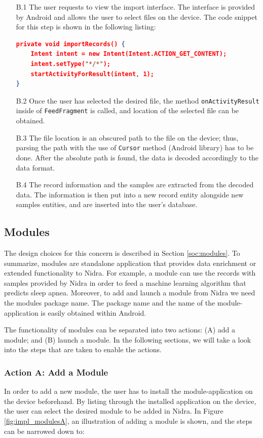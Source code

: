 \begin{itemize}
    \item[B.1] The user requests to view the import interface. The interface is provided by Android and allows the user to select files on the device. The code snippet for this step is shown in the following listing:
\begin{lstlisting}[language=json, caption={}, captionpos=b]
private void importRecords() {
    Intent intent = new Intent(Intent.ACTION_GET_CONTENT);
    intent.setType("*/*");
    startActivityForResult(intent, 1);
}

\end{lstlisting}
    \item[B.2] Once the user has selected the desired file, the method \verb|onActivityResult| inside of \verb|FeedFragment| is called, and location of the selected file can be obtained. 
    \item[B.3] The file location is an obscured path to the file on the device; thus, parsing the path with the use of \verb|Cursor| method (Android library) has to be done. After the absolute path is found, the data is decoded accordingly to the data format.
    \item[B.4] The record information and the samples are extracted from the decoded data. The information is then put into a new record entity alongside new samples entities, and are inserted into the user's database. 
\end{itemize}

\subsection{Modules}
The design choices for this concern is described in Section \ref{soc:modules}. To summarize, modules are standalone application that provides data enrichment or extended functionality to Nidra. For example, a module can use the records with samples provided by Nidra in order to feed a machine learning algorithm that predicts sleep apnea. Moreover, to add and launch a module from Nidra we need the modules package name. The package name and the name of the module-application is easily obtained within Android. 

The functionality of modules can be separated into two actions: (A) add a module; and (B) launch a module.  In the following sections, we will take a look into the steps that are taken to enable the actions.

\subsubsection{Action A: Add a Module}
In order to add a new module, the user has to install the module-application on the device beforehand. By listing through the installed application on the device, the user can select the desired module to be added in Nidra. In Figure \ref{fig:impl_modulesA}, an illustration of adding a module is shown, and the steps can be narrowed down to:

